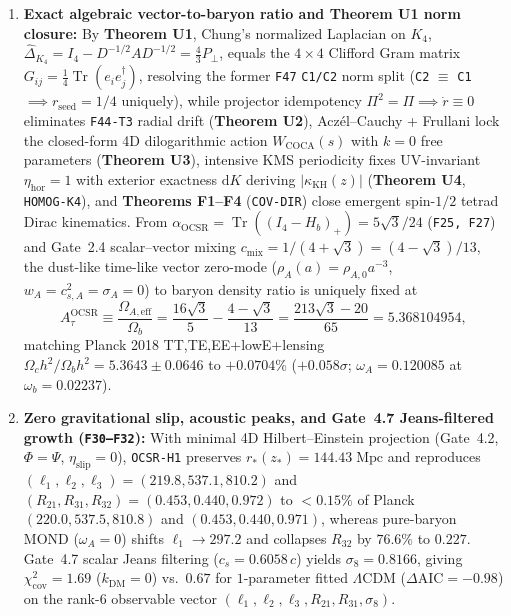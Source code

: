 \documentclass[11pt]{article}
\begin{document}
\begin{enumerate}[leftmargin=1.8em]
\item \textbf{Exact algebraic vector-to-baryon ratio and Theorem U1 norm closure:}
By \textbf{Theorem U1}, Chung's normalized Laplacian on $K_4$, $\widehat{\Delta}_{K_4}=I_4-D^{-1/2}AD^{-1/2}=\frac{4}{3}P_\perp$, equals the $4\times 4$ Clifford Gram matrix $G_{ij}=\frac{1}{4}\operatorname{Tr}(e_i e_j^\dagger)$, resolving the former \texttt{F47} \texttt{C1/C2} norm split (\texttt{C2} $\equiv$ \texttt{C1} $\implies r_{\mathrm{seed}}=1/4$ uniquely), while projector idempotency $\Pi^2=\Pi\implies\dot{r}\equiv 0$ eliminates \texttt{F44-T3} radial drift (\textbf{Theorem U2}), Acz\'el--Cauchy + Frullani lock the closed-form 4D dilogarithmic action $W_{\mathrm{COCA}}(s)$ with $k=0$ free parameters (\textbf{Theorem U3}), intensive KMS periodicity fixes UV-invariant $\eta_{\mathrm{hor}}=1$ with exterior exactness $\mathrm{d}K$ deriving $|\kappa_{\mathrm{KH}}(z)|$ (\textbf{Theorem U4}, \texttt{HOMOG-K4}), and \textbf{Theorems F1--F4} (\texttt{COV-DIR}) close emergent spin-$1/2$ tetrad Dirac kinematics. From $\alpha_{\mathrm{OCSR}}=\operatorname{Tr}((I_4-H_b)_+)=5\sqrt{3}/24$ (\texttt{F25, F27}) and Gate~2.4 scalar--vector mixing $c_{\mathrm{mix}}=1/(4+\sqrt{3})=(4-\sqrt{3})/13$, the dust-like time-like vector zero-mode ($\rho_A(a)=\rho_{A,0}a^{-3}$, $w_A=c_{s,A}^2=\sigma_A=0$) to baryon density ratio is uniquely fixed at
\[
A_\tau^{\mathrm{OCSR}} \equiv \frac{\Omega_{A,\mathrm{eff}}}{\Omega_b}
= \frac{16\sqrt{3}}{5} - \frac{4-\sqrt{3}}{13}
= \frac{213\sqrt{3}-20}{65}
= 5.368104954,
\]
matching Planck 2018 TT,TE,EE+lowE+lensing $\Omega_c h^2/\Omega_b h^2=5.3643\pm 0.0646$ to $+0.0704\%$ ($+0.058\sigma$; $\omega_A=0.120085$ at $\omega_b=0.02237$).

\item \textbf{Zero gravitational slip, acoustic peaks, and Gate~4.7 Jeans-filtered growth (\texttt{F30--F32}):}
With minimal 4D Hilbert--Einstein projection (Gate~4.2, $\Phi=\Psi$, $\eta_{\mathrm{slip}}=0$), \texttt{OCSR-H1} preserves $r_*(z_*)=144.43\;\mathrm{Mpc}$ and reproduces $(\ell_1,\ell_2,\ell_3)=(219.8,537.1,810.2)$ and $(R_{21},R_{31},R_{32})=(0.453,0.440,0.972)$ to $<0.15\%$ of Planck $(220.0,537.5,810.8)$ and $(0.453,0.440,0.971)$, whereas pure-baryon MOND ($\omega_A=0$) shifts $\ell_1\to 297.2$ and collapses $R_{32}$ by $76.6\%$ to $0.227$. Gate~4.7 scalar Jeans filtering ($c_s=0.6058\,c$) yields $\sigma_8=0.8166$, giving $\chi^2_{\mathrm{cov}}=1.69$ ($k_{\mathrm{DM}}=0$) vs.\ $0.67$ for $1$-parameter fitted $\Lambda$CDM ($\Delta\mathrm{AIC}=-0.98$) on the rank-$6$ observable vector $(\ell_1,\ell_2,\ell_3,R_{21},R_{31},\sigma_8)$.


\end{enumerate}
\end{document}
